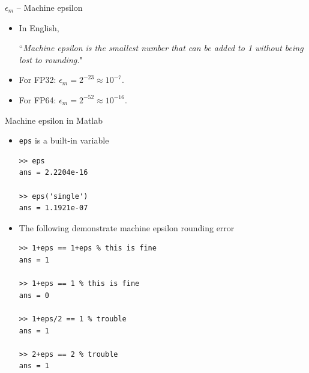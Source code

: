 \documentclass[10pt]{beamer}
\begin{document}
\begin{frame}[fragile]{$\epsilon_m$ -- Machine epsilon}

{}
\begin{itemize}
  
  \item In English, 
    \begin{center}
    ``\textit{Machine epsilon is the smallest number that can be added to 1 without being lost to rounding.}"
    \end{center}
    \vspace{3mm}
    
  \item For FP32:  $\epsilon_m=2^{-23} \approx10^{-7} $.  
  \item For FP64:  $\epsilon_m=2^{-52} \approx 10^{-16}$.  

\end{itemize}

\end{frame}
\begin{frame}[fragile]{Machine epsilon in Matlab}
\begin{itemize}
    \item \texttt{eps} is a built-in variable 
\begin{lstlisting}
>> eps
ans = 2.2204e-16

>> eps('single')
ans = 1.1921e-07
\end{lstlisting}

\item The following demonstrate machine epsilon rounding error
\begin{lstlisting}
>> 1+eps == 1+eps % this is fine 
ans = 1

>> 1+eps == 1 % this is fine 
ans = 0

>> 1+eps/2 == 1 % trouble 
ans = 1

>> 2+eps == 2 % trouble 
ans = 1
\end{lstlisting}
\end{itemize}
\end{frame}
\end{document}
